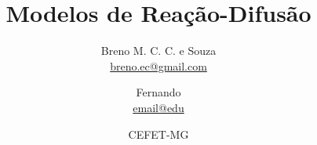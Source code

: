 
\title{\vspace{-15mm}\fontsize{24pt}{10pt}\selectfont\textbf{Modelos de Reação-Difusão}} %

\author{
    Breno M. C. C. e Souza\\
    \href{mailto:breno.ec@gmail.com}{breno.ec@gmail.com}\\
  \and
    Fernando\\
    \href{mailto:email@edu}{email@edu}\\
}

\date{CEFET-MG} %
